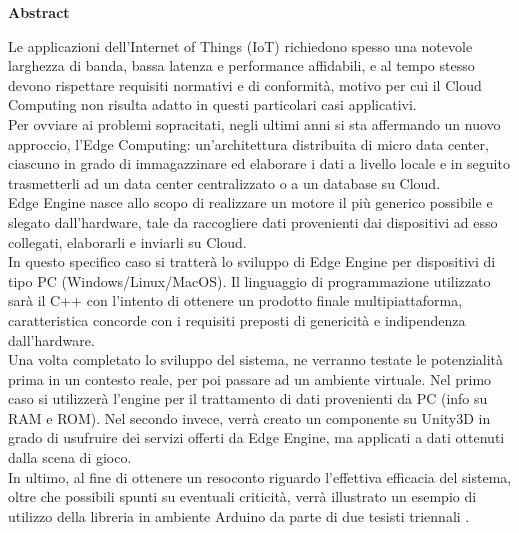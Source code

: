 \clearpage
\renewcommand{\headrulewidth}{0pt}
\null{}
\begin{center}
	\huge{\textbf{Abstract}}
\end{center}
Le applicazioni dell'Internet of Things (IoT) richiedono spesso una notevole larghezza di banda, bassa latenza e performance affidabili, e al tempo stesso devono rispettare requisiti normativi e di conformità, motivo per cui il Cloud Computing non risulta adatto in questi particolari casi applicativi.\\
Per ovviare ai problemi sopracitati, negli ultimi anni si sta affermando un nuovo approccio, l'Edge Computing: un’architettura distribuita di micro data center, ciascuno in grado di immagazzinare ed elaborare i dati a livello locale e in seguito trasmetterli ad un data center centralizzato o a un database su Cloud.\\
Edge Engine nasce allo scopo di realizzare un motore il più generico possibile e slegato dall'hardware, tale da raccogliere dati provenienti dai dispositivi ad esso collegati, elaborarli e inviarli su Cloud.\\
In questo specifico caso si tratterà lo sviluppo di Edge Engine per dispositivi di tipo PC (Windows/Linux/MacOS). Il linguaggio di programmazione utilizzato sarà il C++ con l'intento di ottenere un prodotto finale multipiattaforma, caratteristica concorde con i requisiti preposti di genericità e indipendenza dall'hardware.\\
Una volta completato lo sviluppo del sistema, ne verranno testate le potenzialità prima in un contesto reale, per poi passare ad un ambiente virtuale. Nel primo caso si utilizzerà l'engine per il trattamento di dati provenienti da PC (info su RAM e ROM). Nel secondo invece, verrà creato un componente su Unity3D in grado di usufruire dei servizi offerti da Edge Engine, ma applicati a dati ottenuti dalla scena di gioco.\\
In ultimo, al fine di ottenere un resoconto riguardo l'effettiva efficacia del sistema, oltre che possibili spunti su eventuali criticità, verrà illustrato un esempio di utilizzo della libreria in ambiente Arduino da parte di due tesisti triennali .
\null{}
\clearpage
\renewcommand{\headrulewidth}{0.5pt}

